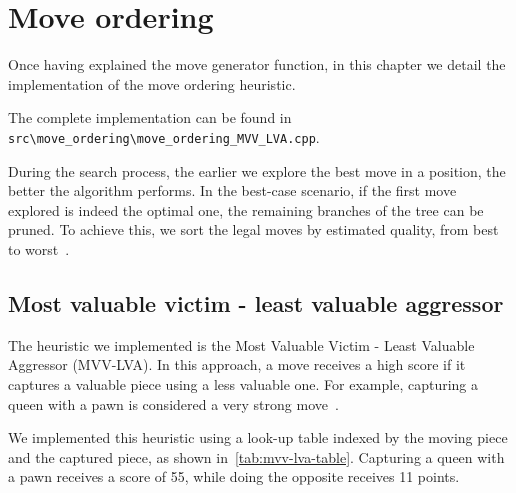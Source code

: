 \section{Move ordering}
\label{cap:moveOrdering}
Once having explained the move generator function, in this chapter we detail the implementation of the move ordering heuristic.

\vspace{1em}

\noindent \parbox{\textwidth}{The complete implementation can be found in\\\texttt{src\textbackslash{}move\_ordering\textbackslash{}move\_ordering\_MVV\_LVA.cpp}.}

\vspace{1em}

\noindent During the search process, the earlier we explore the best move in a position, the better the algorithm performs. In the best-case scenario, if the first move explored is indeed the optimal one, the remaining branches of the tree can be pruned. To achieve this, we sort the legal moves by estimated quality, from best to worst~\cite{MoveOrdering}.

\subsection*{Most valuable victim - least valuable aggressor}

The heuristic we implemented is the Most Valuable Victim - Least Valuable Aggressor (MVV-LVA). In this approach, a move receives a high score if it captures a valuable piece using a less valuable one. For example, capturing a queen with a pawn is considered a very strong move~\cite{MVVLVA}.

\vspace{1em}

\noindent We implemented this heuristic using a look-up table indexed by the moving piece and the captured piece, as shown in~\cref{tab:mvv-lva-table}. Capturing a queen with a pawn receives a score of 55, while doing the opposite receives 11 points.

